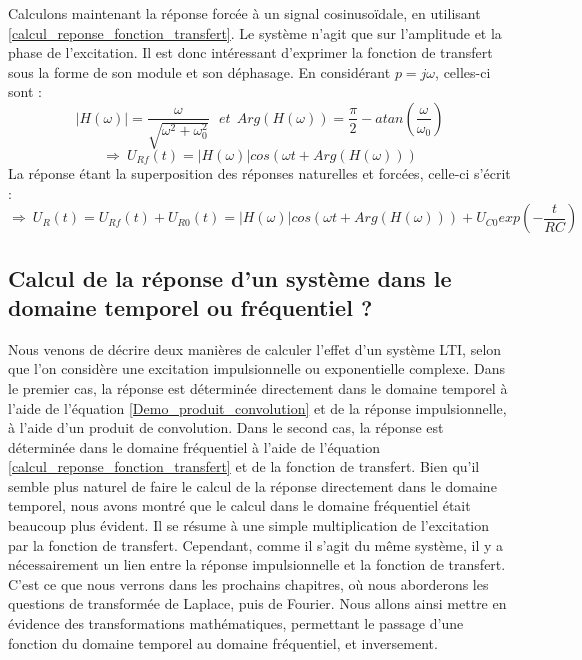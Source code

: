 	Calculons maintenant la réponse forcée à un signal cosinusoïdale, en utilisant \ref{calcul_reponse_fonction_transfert}. Le système n'agit que sur l'amplitude et la phase de l'excitation. Il est donc intéressant d'exprimer la fonction de transfert sous la forme de son module et son déphasage. En considérant $p=j\omega$, celles-ci sont :
	\begin{equation*}
	|H(\omega)|=\frac{\omega}{\sqrt{\omega^{2}+\omega_{0}^{2}}}~~~et~~Arg(H(\omega))=\frac{\pi}{2}-atan(\frac{\omega}{\omega_{0}})
	\end{equation*}
	\begin{equation*}
	\Rightarrow~U_{Rf}(t)=|H(\omega)|cos(\omega t+Arg(H(\omega)))
	\end{equation*}
	La réponse étant la superposition des réponses naturelles et forcées, celle-ci s'écrit :
	\begin{equation*}
	\Rightarrow~U_{R}(t)=U_{Rf}(t)+U_{R0}(t)=|H(\omega)|cos(\omega t+Arg(H(\omega)))+U_{C0}exp(-\frac{t}{RC})
	\end{equation*}
	
	\vspace{1\baselineskip}

	\subsection{Calcul de la réponse d'un système dans le domaine temporel ou fréquentiel ?}
	
	Nous venons de décrire deux manières de calculer l'effet d'un système LTI, selon que l'on considère une excitation impulsionnelle ou exponentielle complexe. Dans le premier cas, la réponse est déterminée directement dans le domaine temporel à l'aide de l'équation \ref{Demo_produit_convolution} et de la réponse impulsionnelle, à l'aide d'un produit de convolution. Dans le second cas, la réponse est déterminée dans le domaine fréquentiel à l'aide de l'équation \ref{calcul_reponse_fonction_transfert} et de la fonction de transfert.	
	Bien qu'il semble plus naturel de faire le calcul de la réponse directement dans le domaine temporel, nous avons montré que le calcul dans le domaine fréquentiel était beaucoup plus évident. Il se résume à une simple multiplication de l'excitation par la fonction de transfert. 
	Cependant, comme il s'agit du même système, il y a nécessairement un lien entre la réponse impulsionnelle et la fonction de transfert. C'est ce que nous verrons dans les prochains chapitres, où nous aborderons les questions de transformée de Laplace, puis de Fourier. Nous allons ainsi mettre en évidence des transformations mathématiques, permettant le passage d'une fonction du domaine temporel au domaine fréquentiel, et inversement.
	
